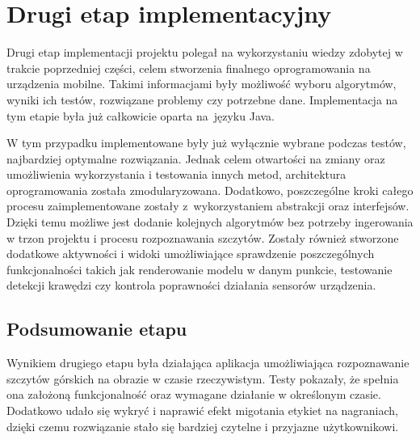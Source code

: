 \newpage

\section{Drugi etap implementacyjny} \label{sec:drugi_etap}

Drugi etap implementacji projektu polegał na wykorzystaniu wiedzy zdobytej w trakcie poprzedniej części, celem stworzenia finalnego oprogramowania na urządzenia mobilne. Takimi informacjami były możliwość wyboru algorytmów, wyniki ich testów, rozwiązane problemy czy potrzebne dane. Implementacja na tym etapie była już całkowicie oparta na~języku Java. 

W tym przypadku implementowane były już wyłącznie wybrane podczas testów, najbardziej optymalne rozwiązania. Jednak celem otwartości na zmiany oraz umożliwienia wykorzystania i testowania innych metod, architektura oprogramowania została zmodularyzowana. Dodatkowo, poszczególne kroki całego procesu zaimplementowane zostały z~wykorzystaniem abstrakcji oraz interfejsów. Dzięki temu możliwe jest dodanie kolejnych algorytmów bez potrzeby ingerowania w trzon projektu i procesu rozpoznawania szczytów. Zostały również stworzone dodatkowe aktywności i widoki umożliwiające sprawdzenie poszczególnych funkcjonalności takich jak renderowanie modelu w danym punkcie, testowanie detekcji krawędzi czy kontrola poprawności działania sensorów urządzenia. 



\subsection{Podsumowanie etapu}

Wynikiem drugiego etapu była działająca aplikacja umożliwiająca rozpoznawanie szczytów górskich na obrazie w czasie rzeczywistym. Testy pokazały, że spełnia ona założoną funkcjonalność oraz wymagane działanie w określonym czasie. Dodatkowo udało się wykryć i naprawić efekt migotania etykiet na nagraniach, dzięki czemu rozwiązanie stało się bardziej czytelne i przyjazne użytkownikowi. 